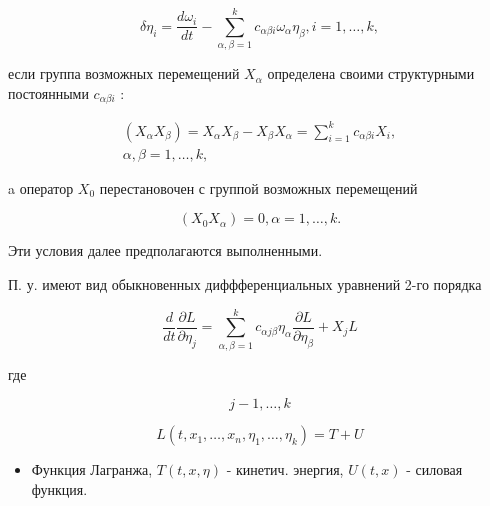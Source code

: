 \documentclass[10pt]{article}
\begin{document}
\[

\delta \eta_{i}=\frac{d \omega_{i}}{d t}-\sum_{\alpha, \beta=1}^{k} c_{\alpha \beta i} \omega_{\alpha} \eta_{\beta}, i=1, \ldots, k,

\]



если группа возможных перемещений $X_{\alpha}$ определена своими структурными постоянными $c_{\alpha \beta i}$ :



\[

\begin{gathered}

\left(X_{\alpha} X_{\beta}\right)=X_{\alpha} X_{\beta}-X_{\beta} X_{\alpha}=\sum_{i=1}^{k} c_{\alpha \beta i} X_{i}, \\

\alpha, \beta=1, \ldots, k,

\end{gathered}

\]



a оператор $X_{0}$ перестановочен с группой возможных перемещений



\[

\left(X_{0} X_{\alpha}\right)=0, \alpha=1, \ldots, k .

\]



Эти условия далее предполагаются выполненными.



П. у. имеют вид обыкновенных диффференциальных уравнений 2-го порядка



\[

\frac{d}{d t} \frac{\partial L}{\partial \eta_{j}}=\sum_{\alpha, \beta=1}^{k} c_{\alpha j \beta} \eta_{\alpha} \frac{\partial L}{\partial \eta_{\beta}}+X_{j} L

\]



где



\[

j-1, \ldots, k

\]



\[

L\left(t, x_{1}, \ldots, x_{n}, \eta_{1}, \ldots, \eta_{k}\right)=T+U

\]



\begin{itemize}

  \item Функция Лагранжа, $T(t, x, \eta)$ - кинетич. энергия, $U(t, x)$ - силовая функция.

\end{itemize}
\end{document}
